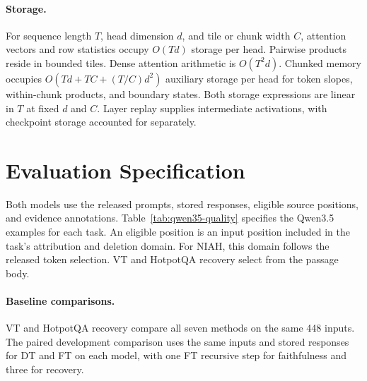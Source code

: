 \paragraph{Storage.}
For sequence length $T$, head dimension $d$, and tile or chunk width $C$, attention vectors and row statistics occupy $O(Td)$ storage per head. Pairwise products reside in bounded tiles. Dense attention arithmetic is $O(T^2d)$. Chunked memory occupies $O(Td+TC+(T/C)d^2)$ auxiliary storage per head for token slopes, within-chunk products, and boundary states. Both storage expressions are linear in $T$ at fixed $d$ and $C$. Layer replay supplies intermediate activations, with checkpoint storage accounted for separately.

\clearpage
\section{Evaluation Specification}
\label{app:evaluation}
Both models use the released prompts, stored responses, eligible source positions, and evidence annotations. Table~\ref{tab:qwen35-quality} specifies the Qwen3.5 examples for each task. An eligible position is an input position included in the task's attribution and deletion domain. For NIAH, this domain follows the released token selection. VT and HotpotQA recovery select from the passage body.

\paragraph{Baseline comparisons.}
VT and HotpotQA recovery compare all seven methods on the same 448 inputs. The paired development comparison uses the same inputs and stored responses for DT and FT on each model, with one FT recursive step for faithfulness and three for recovery.

